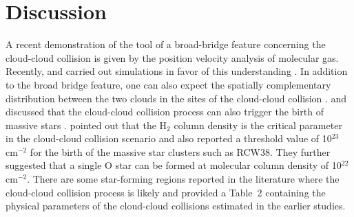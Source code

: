 \documentclass[iop]{emulateapj}
\begin{document}
\section{Discussion}
\label{sec:disc}
%
A recent demonstration of the tool of a broad-bridge feature concerning the cloud-cloud collision 
is given by the position velocity analysis of molecular gas. Recently, \citet{haworth15a} and \citet{haworth15b} carried 
out simulations in favor of this understanding \citep[also see][]{torii11,torii15,torii16,fukui14,fukui16,dewangan15,baug16}. 
In addition to the broad bridge feature, one can also expect the spatially complementary distribution between the two clouds 
in the sites of the cloud-cloud collision \citep[e.g.,][]{torii16}. 
\citet{fukui14} and \citet{torii15} discussed that the cloud-cloud collision process can also trigger the birth of massive stars \citep[also see][]{fukui16,torii16}.  \citet{fukui16} pointed out that the H$_{2}$ column density is the critical parameter in the cloud-cloud collision 
scenario and also reported a threshold value of 10$^{23}$ cm$^{-2}$ for the birth of the massive star clusters 
such as RCW38. They further suggested that a single O star can be formed at molecular column density 
of 10$^{22}$ cm$^{-2}$. 
There are some star-forming regions reported in the literature where the cloud-cloud collision process is likely and
\citet{torii16} provided a Table~2 containing the physical parameters of the cloud-cloud collisions 
estimated in the earlier studies. 
\end{document}
